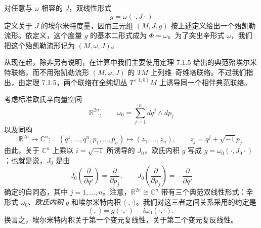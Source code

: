 对任意与 $\omega$ 相容的 $J$，双线性形式
\[
 g=\omega(\cdot,J\cdot)
\]
定义关于 $J$ 的埃尔米特度量，因而三元组 $(M,J,g)$ 按上述定义给出一个殆凯勒流形。依定义，这个度量 $g$ 的基本二形式成为 $\Phi=\omega$。为了突出辛形式 $\omega$，我们把这个殆凯勒流形记为 $(M,\omega,J)$。

从现在起，除非另有说明，在计算中我们主要使用定理 7.1.5 给出的典范殆埃尔米特联络，而不用殆凯勒流形 $(M,\omega,J)$ 的 $TM$ 上列维--奇维塔联络。不过我们指出，由定理 7.1.5，两个联络在全纯切丛 $T^{(1,0)}M$ 上诱导同一个相伴典范联络。

\begin{example}\label{ex:standard-euclidean-almost-kahler}
考虑标准欧氏辛向量空间
\[
 \mathbb R^{2n},\qquad
 \omega_0=\sum_{j=1}^n dq^j\wedge dp_j
\]
以及同构
\[
 \mathbb R^{2n}\longrightarrow\mathbb C^n;
 \quad(q^1,\ldots,q^n,p_1,\ldots,p_n)
 \longmapsto(z_1,\ldots,z_n),
 \qquad z_j=q^j+\sqrt{-1}p_j.
\]
由此，关于 $\mathbb C^n$ 上乘以 $i=\sqrt{-1}$ 所诱导的 $J_0$，欧氏内积 $g$ 写成 $g=\omega_0(\cdot,J_0\cdot)$；也就是说，$J_0$ 是由
\[
 J_0\left(\frac\partial{\partial q^j}\right)
 =\frac\partial{\partial p_j},\qquad
 J_0\left(\frac\partial{\partial p_j}\right)
 =-\frac\partial{\partial q^j}
\]
确定的自同态，其中 $j=1,\ldots,n$。注意，$\mathbb R^{2n}\cong\mathbb C^n$ 带有三个典范双线性形式：辛形式 $\omega_0$、\emph{欧氏内积} $g$ 和埃尔米特内积 $\langle\cdot,\cdot\rangle$。我们对这三者之间关系采用的约定是
\[
 \langle\cdot,\cdot\rangle
 =g(\cdot,\cdot)-i\omega_0(\cdot,\cdot).
\]
换言之，埃尔米特内积关于第一个变元复线性，关于第二个变元复反线性。
\end{example}
